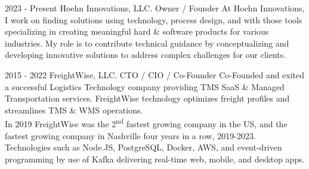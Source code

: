 \vfill\null
{}

\cvevent
{2023 - Present}
{Hoehn Innovations, LLC.}
{Owner / Founder}
{At Hoehn Innovations, I work on finding solutions using technology,
process design, and with those tools specializing in creating meaningful hard \& software products for various industries. My role is to contribute technical guidance by conceptualizing and developing innovative solutions to address complex challenges for our clients.}
{}
{} %
{}


\vfill\null
\cvevent
{2015 - 2022}
{FreightWise, LLC.}
{CTO / CIO / Co-Founder}
{Co-Founded and exited a successful Logistics Technology company providing TMS SaaS \& Managed Transportation services. FreightWise technology optimizes freight profiles and streamlines TMS \& WMS operations.\\[6pt]
In 2019 FreightWise was the 2\textsuperscript{nd} fastest growing company in the US, and the fastest growing company in Nashville four years in a row, 2019-2023.\\[6pt]
Technologies such as Node.JS, PostgreSQL, Docker, AWS, and event-driven programming by use of Kafka delivering real-time web, mobile, and desktop apps.}
{}
{}
{}


